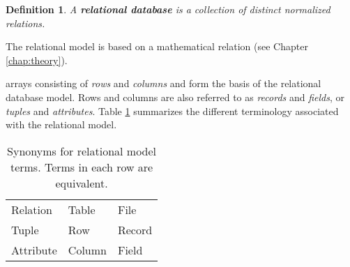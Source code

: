 \documentclass{article}
\newtheorem{definition}{Definition}
\begin{document}
  
  


\begin{definition}
A \textbf{relational database} is a collection of distinct normalized relations.
\end{definition}




The relational model is based on a mathematical relation (see Chapter \ref{chap:theory}).



arrays consisting of \textit{rows} and \textit{columns} and form the basis
of the relational database model. Rows and columns are also referred to as
\textit{records} and \textit{fields}, or \textit{tuples} and \textit{attributes}.
 Table \ref{tab:altterms}  summarizes the different terminology associated
with the relational model.  

\begin{table}[h!]
    \centering
    \begin{tabular}{lll}
        \toprule
        Relation      &   Table     &   File \\  
        Tuple         &   Row        &  Record   \\
        Attribute      &   Column     &  Field   \\   
          \bottomrule
    \end{tabular}
    \caption{Synonyms for relational model terms. Terms in each row are equivalent.}
    \label{tab:altterms}
\end{table}
 
 
 
 
 
  
\end{document}
